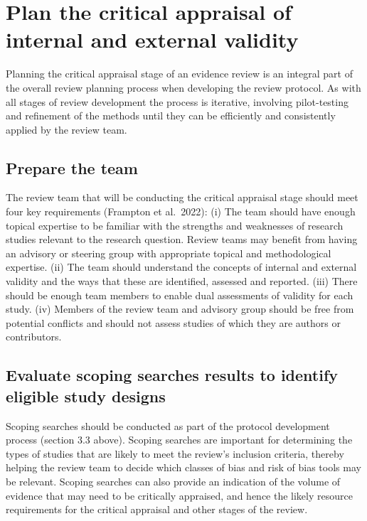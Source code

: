 \documentclass[
  letterpaper,
  DIV=11,
  numbers=noendperiod]{scrreprt}
\makeatletter
\let\oldparagraph\paragraph
\renewcommand{\paragraph}{
    \@ifstar
      \xxxParagraphStar
      \xxxParagraphNoStar
  }
\newcommand{\xxxParagraphStar}[1]{\oldparagraph*{#1}\mbox{}}
\newcommand{\xxxParagraphNoStar}[1]{\oldparagraph{#1}\mbox{}}
\makeatother
\begin{document}
\paragraph{}\label{section-1}

\section{Plan the critical appraisal of internal and external
validity}\label{plan-the-critical-appraisal-of-internal-and-external-validity}

Planning the critical appraisal stage of an evidence review is an
integral part of the overall review planning process when developing the
review protocol. As with all stages of review development the process is
iterative, involving pilot-testing and refinement of the methods until
they can be efficiently and consistently applied by the review team.

\subsection{Prepare the team}\label{prepare-the-team}

The review team that will be conducting the critical appraisal stage
should meet four key requirements (Frampton et al.~2022): (i) The team
should have enough topical expertise to be familiar with the strengths
and weaknesses of research studies relevant to the research question.
Review teams may benefit from having an advisory or steering group with
appropriate topical and methodological expertise. (ii) The team should
understand the concepts of internal and external validity and the ways
that these are identified, assessed and reported. (iii) There should be
enough team members to enable dual assessments of validity for each
study. (iv) Members of the review team and advisory group should be free
from potential conflicts and should not assess studies of which they are
authors or contributors.

\subsection{Evaluate scoping searches results to identify eligible study
designs}\label{evaluate-scoping-searches-results-to-identify-eligible-study-designs}

Scoping searches should be conducted as part of the protocol development
process (section 3.3 above). Scoping searches are important for
determining the types of studies that are likely to meet the review's
inclusion criteria, thereby helping the review team to decide which
classes of bias and risk of bias tools may be relevant. Scoping searches
can also provide an indication of the volume of evidence that may need
to be critically appraised, and hence the likely resource requirements
for the critical appraisal and other stages of the review.
\end{document}
